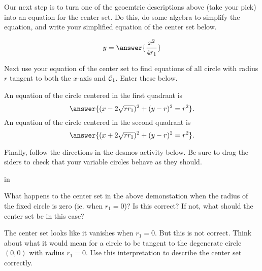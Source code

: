 \documentclass{ximera}
\newcommand{\pskip}{\vskip 0.1 in}
\begin{document}
\begin{exploration}

Our next step is to turn one of the geoemtric descriptions above (take your pick) into an equation for the center set. Do this, do some algebra to simplify the equation, and write your simplified equation of the center set below.
\begin{question} \label{Q341:Spheres}
\[
    y = \answer{\frac{x^2}{4r_1}}
\]
\end{question}


Next use your equation of the center set to find equations of all circle with radius $r$  tangent to both the $x$-axis and ${\cal C}_1$. Enter these below.

\begin{question} \label{Q4541:Spheres}
An equation of the circle centered in the first quadrant is
\[
     \answer{(x-2\sqrt{rr_1})^2 + (y-r)^2 = r^2} .
\]
An equation of the circle centered in the second quadrant is
\[
     \answer{(x+2\sqrt{rr_1})^2 + (y-r)^2 = r^2} .
\]
\end{question}

Finally, follow the directions in the desmos activity below. Be sure to drag the siders to check that your variable circles behave as they should.


 
\begin{onlineOnly}
    \begin{center}
\end{center}
\end{onlineOnly}

\pskip

\begin{question} \label{Q441:Spheres}
What happens to the center set in the above demonstation when the radius of the fixed circle is zero (ie. when $r_1=0$)? Is this correct? If not, what should the center set be in this case?
\begin{hint}
The center set looks like it vanishes when $r_1=0$. But this is not correct. Think about what it would mean for a circle to be tangent to the degenerate circle $(0,0)$ with radius $r_1=0$. Use this interpretation to describe the center set correctly.
\end{hint}

\end{question}
\end{exploration}


\begin{exploration}
 
\begin{onlineOnly}
    \begin{center}
\end{center}
\end{onlineOnly}
\end{exploration}
\end{document}
